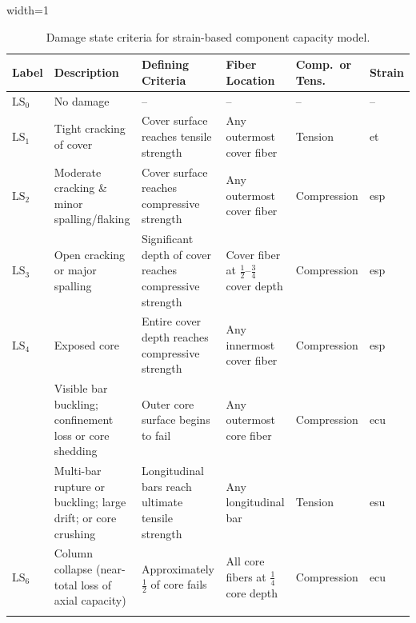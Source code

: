 \begin{table}[H]
\centering
\caption{Damage state criteria for strain-based component capacity model.}
\begin{adjustbox}{width=1\textwidth}
\renewcommand{\arraystretch}{1.4}
\begin{tabular}{>{\centering\arraybackslash}m{1.2cm}
                 m{4.2cm}
                 m{5.2cm}
                 m{3.4cm}
                 >{\centering\arraybackslash}m{2.4cm}
                 >{\centering\arraybackslash}m{1.4cm}}

\toprule
\textbf{Label} &
\textbf{Description} &
\textbf{Defining Criteria} &
\textbf{Fiber Location} &
\textbf{Comp.\ or Tens.} &
\textbf{Strain} \\
\midrule
\addlinespace[4pt]

$\mathrm{LS}_{0}$ & No damage & -- & -- & -- & -- \\
\addlinespace[8pt]

$\mathrm{LS}_{1}$ & Tight cracking of cover &
  Cover surface reaches tensile strength &
  Any outermost cover fiber & Tension & \gls{et} \\
\addlinespace[8pt]

$\mathrm{LS}_{2}$ & Moderate cracking \& minor spalling/flaking &
  Cover surface reaches compressive strength &
  Any outermost cover fiber & Compression & \gls{esp} \\
\addlinespace[8pt]

$\mathrm{LS}_{3}$ & Open cracking or major spalling &
  Significant depth of cover reaches compressive strength &
  Cover fiber at $\tfrac{1}{2}$--$\tfrac{3}{4}$ cover depth & Compression & \gls{esp} \\
\addlinespace[8pt]

$\mathrm{LS}_{4}$ & Exposed core &
  Entire cover depth reaches compressive strength &
  Any innermost cover fiber & Compression & \gls{esp} \\
\addlinespace[8pt]

\multirow{2}{*}{$\mathrm{LS}_{5}$} &
  Visible bar buckling; confinement loss or core shedding &
  Outer core surface begins to fail &
  Any outermost core fiber & Compression & \gls{ecu} \\[6pt]
& Multi-bar rupture or buckling; large drift; or core crushing &
  Longitudinal bars reach ultimate tensile strength &
  Any longitudinal bar & Tension & \gls{esu} \\
\addlinespace[8pt]

$\mathrm{LS}_{6}$ & Column collapse (near-total loss of axial capacity) &
  Approximately $\tfrac{1}{2}$ of core fails &
  All core fibers at $\tfrac{1}{4}$ core depth & Compression & \gls{ecu} \\
\addlinespace[4pt]

\bottomrule
\end{tabular}
\end{adjustbox}
\label{tab:DSv3}
\end{table}

